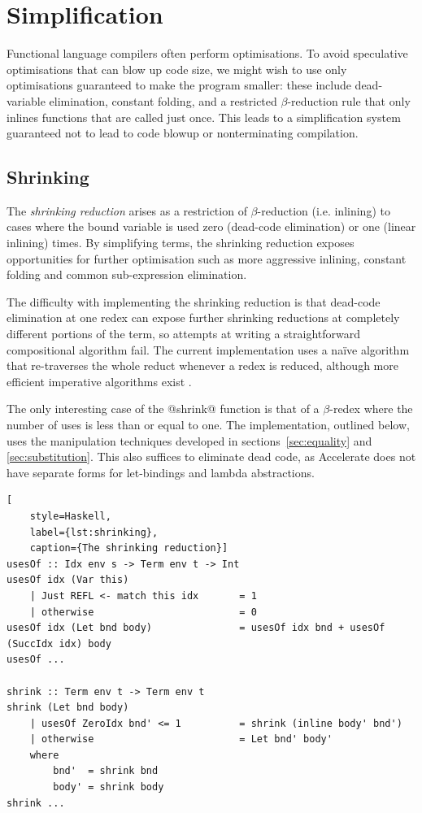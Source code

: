 

\section{Simplification}
\label{sec:simplification}

Functional language compilers often perform optimisations. To avoid speculative
optimisations that can blow up code size, we might wish to use only
optimisations guaranteed to make the program smaller: these include
dead-variable elimination, constant folding, and a restricted $\beta$-reduction
rule that only inlines functions that are called just once. This leads to a
simplification system guaranteed not to lead to code blowup or nonterminating
compilation.

\subsection{Shrinking}

The \emph{shrinking reduction} arises as a restriction of $\beta$-reduction
(i.e. inlining) to cases where the bound variable is used zero (dead-code
elimination) or one (linear inlining) times. By simplifying terms,
the shrinking reduction exposes opportunities for further optimisation such as
more aggressive inlining, constant folding and common sub-expression
elimination. %

The difficulty with implementing the shrinking reduction is that dead-code
elimination at one redex can expose further shrinking reductions at completely
different portions of the term, so attempts at writing a straightforward
compositional algorithm fail. The current implementation uses a na\"ive
algorithm that re-traverses the whole reduct whenever a redex is reduced,
although more efficient imperative algorithms exist
\cite{Appel:1997gs,Benton:2004ua,Kennedy:2007cb}.

The only interesting case of the @shrink@ function is that of a
$\beta$-redex where the number of uses is less than or equal to one. The
implementation, outlined below, uses the  manipulation
techniques developed in sections~\ref{sec:equality} and \ref{sec:substitution}.
This also suffices to eliminate dead code, as Accelerate does not have separate
forms for let-bindings and lambda abstractions.
%
\begin{lstlisting}[
    style=Haskell,
    label={lst:shrinking},
    caption={The shrinking reduction}]
usesOf :: Idx env s -> Term env t -> Int
usesOf idx (Var this)
    | Just REFL <- match this idx       = 1
    | otherwise                         = 0
usesOf idx (Let bnd body)               = usesOf idx bnd + usesOf (SuccIdx idx) body
usesOf ...

shrink :: Term env t -> Term env t
shrink (Let bnd body)
    | usesOf ZeroIdx bnd' <= 1          = shrink (inline body' bnd')
    | otherwise                         = Let bnd' body'
    where
        bnd'  = shrink bnd
        body' = shrink body
shrink ...
\end{lstlisting}


